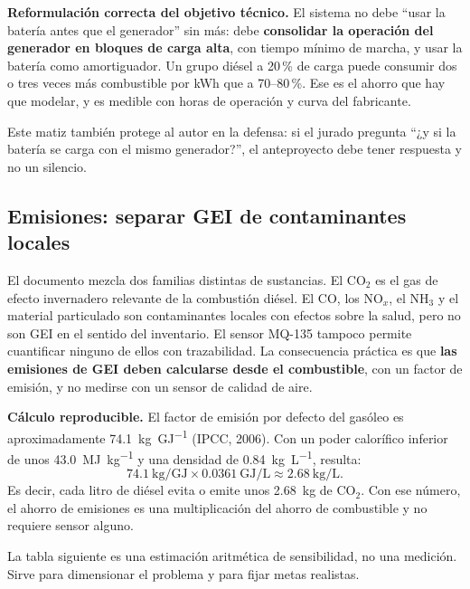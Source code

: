 \documentclass[11pt,a4paper]{article}
\begin{document}
\begin{cajaConcepto}
\textbf{Reformulación correcta del objetivo técnico.} El sistema no debe ``usar la batería antes que el generador'' sin más: debe \textbf{consolidar la operación del generador en bloques de carga alta}, con tiempo mínimo de marcha, y usar la batería como amortiguador. Un grupo diésel a 20\,\% de carga puede consumir dos o tres veces más combustible por kWh que a 70--80\,\%. Ese es el ahorro que hay que modelar, y es medible con horas de operación y curva del fabricante.
\end{cajaConcepto}

Este matiz también protege al autor en la defensa: si el jurado pregunta ``¿y si la batería se carga con el mismo generador?'', el anteproyecto debe tener respuesta y no un silencio.

\subsection{Emisiones: separar GEI de contaminantes locales}

El documento mezcla dos familias distintas de sustancias. El CO$_2$ es el gas de efecto invernadero relevante de la combustión diésel. El CO, los NO$_x$, el NH$_3$ y el material particulado son contaminantes locales con efectos sobre la salud, pero no son GEI en el sentido del inventario. El sensor MQ-135 tampoco permite cuantificar ninguno de ellos con trazabilidad. La consecuencia práctica es que \textbf{las emisiones de GEI deben calcularse desde el combustible}, con un factor de emisión, y no medirse con un sensor de calidad de aire.

\begin{cajaEjemplo}
\textbf{Cálculo reproducible.} El factor de emisión por defecto del gasóleo es aproximadamente \SI{74.1}{\kilo\gram\per\giga\joule} (IPCC, 2006). Con un poder calorífico inferior de unos \SI{43.0}{\mega\joule\per\kilo\gram} y una densidad de \SI{0.84}{\kilo\gram\per\liter}, resulta:
\[
\SI{74.1}{\kilo\gram\per\giga\joule}\times \SI{0.0361}{\giga\joule\per\liter} \approx \SI{2.68}{\kilo\gram\per\liter}.
\]
Es decir, cada litro de diésel evita o emite unos \SI{2.68}{\kilo\gram} de CO$_2$. Con ese número, el ahorro de emisiones es una multiplicación del ahorro de combustible y no requiere sensor alguno.
\end{cajaEjemplo}

La tabla siguiente es una estimación aritmética de sensibilidad, no una medición. Sirve para dimensionar el problema y para fijar metas realistas.
\end{document}
